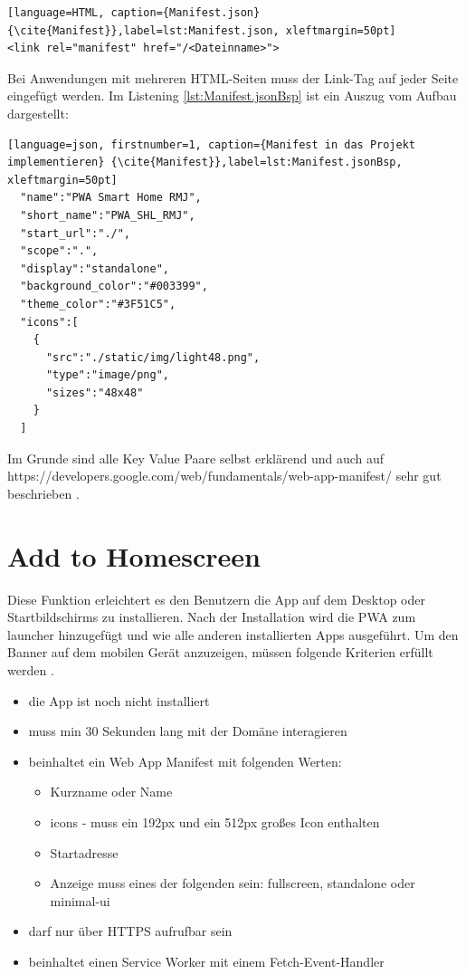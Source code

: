 \begin{lstlisting}[language=HTML, caption={Manifest.json} {\cite{Manifest}},label=lst:Manifest.json, xleftmargin=50pt]
<link rel="manifest" href="/<Dateinname>">
\end{lstlisting}

Bei Anwendungen mit mehreren \acs{HTML}-Seiten muss der Link-Tag auf jeder Seite eingefügt werden. 
Im Listening \ref{lst:Manifest.jsonBsp} ist ein Auszug vom Aufbau dargestellt:
	\begin{lstlisting}[language=json, firstnumber=1, caption={Manifest in das Projekt implementieren} {\cite{Manifest}},label=lst:Manifest.jsonBsp, xleftmargin=50pt]
  "name":"PWA Smart Home RMJ",
  "short_name":"PWA_SHL_RMJ",
  "start_url":"./",
  "scope":".",
  "display":"standalone",
  "background_color":"#003399",
  "theme_color":"#3F51C5",
  "icons":[
    {
      "src":"./static/img/light48.png",
      "type":"image/png",
      "sizes":"48x48"
    }
  ]

\end{lstlisting}

Im Grunde sind alle Key Value Paare selbst erklärend und auch auf https://developers.google.com/web/fundamentals/web-app-manifest/ sehr gut beschrieben \cite{Manifest}. 

\section{Add to Homescreen}\label{sub:AddtoHomescreen}
Diese Funktion erleichtert es den Benutzern die App auf dem Desktop oder Startbildschirms zu installieren. Nach der Installation wird die PWA zum launcher hinzugefügt und wie alle anderen installierten Apps ausgeführt.
Um den Banner auf dem mobilen Gerät anzuzeigen, müssen folgende Kriterien erfüllt werden \cite{AddToHomescreen}.


\begin{itemize}
    \item  die App ist noch nicht installiert
	\item  muss min 30 Sekunden lang mit der Domäne interagieren
	\item  beinhaltet ein Web App Manifest mit folgenden Werten:
		 \begin{itemize}
         \item Kurzname oder Name
         \item icons - muss ein 192px und ein 512px großes Icon enthalten
         \item Startadresse
         \item Anzeige muss eines der folgenden sein: fullscreen, standalone oder \\ minimal-ui
      	\end{itemize}
    \item 	darf nur über HTTPS aufrufbar sein
    \item beinhaltet einen Service Worker mit einem Fetch-Event-Handler  
\end{itemize}


